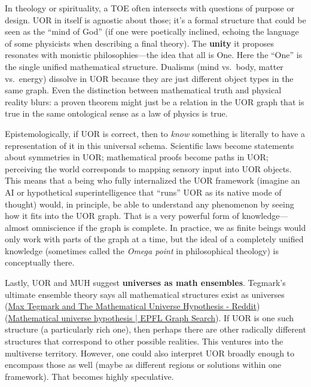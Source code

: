 \documentclass[12pt]{article}
\begin{document}
\medskip

In theology or spirituality, a TOE often intersects with questions of purpose or design. UOR in itself is agnostic about those; it’s a formal structure that could be seen as the “mind of God” (if one were poetically inclined, echoing the language of some physicists when describing a final theory). The \textbf{unity} it proposes resonates with monistic philosophies---the idea that all is One. Here the “One” is the single unified mathematical structure. Dualisms (mind vs.\ body, matter vs.\ energy) dissolve in UOR because they are just different object types in the same graph. Even the distinction between mathematical truth and physical reality blurs: a proven theorem might just be a relation in the UOR graph that is true in the same ontological sense as a law of physics is true.

\medskip

Epistemologically, if UOR is correct, then to \emph{know} something is literally to have a representation of it in this universal schema. Scientific laws become statements about symmetries in UOR; mathematical proofs become paths in UOR; perceiving the world corresponds to mapping sensory input into UOR objects. This means that a being who fully internalized the UOR framework (imagine an AI or hypothetical superintelligence that “runs” UOR as its native mode of thought) would, in principle, be able to understand any phenomenon by seeing how it fits into the UOR graph. That is a very powerful form of knowledge---almost omniscience if the graph is complete. In practice, we as finite beings would only work with parts of the graph at a time, but the ideal of a completely unified knowledge (sometimes called the \emph{Omega point} in philosophical theology) is conceptually there.

\medskip

Lastly, UOR and MUH suggest \textbf{universes as math ensembles}. Tegmark’s ultimate ensemble theory says all mathematical structures exist as universes (\href{https://www.reddit.com/r/mathematics/comments/1dx448m/max_tegmark_and_the_mathematical_universe/#:~:text=Reddit%20www,proposed%20by%20cosmologist%20Max}{Max Tegmark and The Mathematical Universe Hypothesis - Reddit}) (\href{https://graphsearch.epfl.ch/concept/2148329#:~:text=Mathematical%20universe%20hypothesis%20,%28TOE}{Mathematical universe hypothesis | EPFL Graph Search}). If UOR is one such structure (a particularly rich one), then perhaps there are other radically different structures that correspond to other possible realities. This ventures into the multiverse territory. However, one could also interpret UOR broadly enough to encompass those as well (maybe as different regions or solutions within one framework). That becomes highly speculative.
\end{document}

